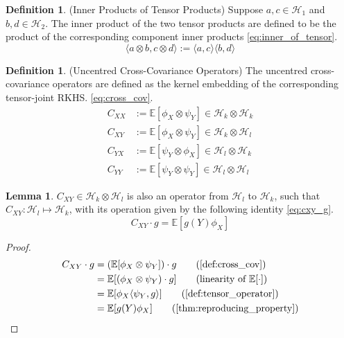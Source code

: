 \documentclass[twoside]{article} \usepackage{aistats2017}
\theoremstyle{definition}
\newtheorem{definition}[theorem]{Definition}
\newtheorem{lemma}[theorem]{Lemma}
\newcommand{\rv}[1]{{#1}}
\newcommand{\expect}[1]{{\mathbb{E}[#1]}}
\newcommand{\inner}[2]{{\langle #1, #2 \rangle}}
\newcommand{\Hk}{\mathcal{H}_{k}}
\newcommand{\Hl}{\mathcal{H}_{l}}
\newcommand{\phiX}{\phi_{\rv{X}}}
\newcommand{\psiY}{\psi_{\rv{Y}}}
\newcommand{\Cxy}{C_{\rv{X} \rv{Y}}}
\newcommand{\Cyx}{C_{\rv{Y} \rv{X}}}
\newcommand{\Cxx}{C_{\rv{X} \rv{X}}}
\newcommand{\Cyy}{C_{\rv{Y} \rv{Y}}}
\begin{document}
		\begin{definition} \label{def:inner_of_tensor}
			(Inner Products of Tensor Products)
			Suppose $a, c \in \mathcal{H}_{1}$ and $b, d \in \mathcal{H}_{2}$. The inner product of the two tensor products are defined to be the product of the corresponding component inner products \eqref{eq:inner_of_tensor}.
			\begin{equation}
				\inner{a \otimes b}{c \otimes d} := \inner{a}{c} \inner{b}{d}
			\label{eq:inner_of_tensor}
			\end{equation}
		\end{definition}
		
		\begin{definition} \label{def:cross_cov}
			(Uncentred Cross-Covariance Operators)
			The uncentred cross-covariance operators are defined as the kernel embedding of the corresponding tensor-joint RKHS. \eqref{eq:cross_cov}.
			\begin{equation}
			\begin{aligned}
				\Cxx &:= \expect{\phiX \otimes \psiY} \in \Hk \otimes \Hk \\
				\Cxy &:= \expect{\phiX \otimes \psiY} \in \Hk \otimes \Hl \\
				\Cyx &:= \expect{\psiY \otimes \phiX} \in \Hl \otimes \Hk \\
				\Cyy &:= \expect{\psiY \otimes \psiY} \in \Hl \otimes \Hl 
			\label{eq:cross_cov}
			\end{aligned}
			\end{equation}		
		\end{definition}
	
		\begin{lemma} \label{thm:cxy_g}
			$\Cxy \in \mathcal{H}_{k} \otimes \mathcal{H}_{l}$ is also an operator from $\Hl$ to $\Hk$, such that $\Cxy : \Hl \mapsto \Hk$, with its operation given by the following identity \eqref{eq:cxy_g}.
			\begin{equation}
				\Cxy \cdot g = \expect{g(\rv{Y}) \phiX}
			\label{eq:cxy_g}
			\end{equation}
		
			\begin{proof}
			\begin{align*}
				\Cxy \cdot g &=  (\expect{\phiX \otimes \psiY}) \cdot g \tag{\cref{def:cross_cov}} \\
				&= \expect{(\phiX \otimes \psiY) \cdot g} \tag{linearity of $\expect{\cdot}$} \\
				&= \expect{\phiX \inner{\psiY}{g}} \tag{\cref{def:tensor_operator}} \\
				&= \expect{g(\rv{Y}) \phiX} \tag{\cref{thm:reproducing_property}}
			\end{align*}
			\end{proof}
		\end{lemma}
			
\end{document}
